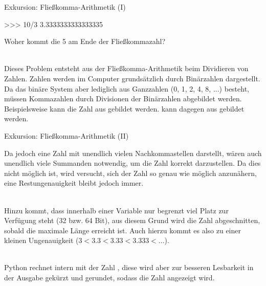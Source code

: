         \begin{frame}[fragile]{Exkursion: Fließkomma-Arithmetik (I)}
\begin{pyconcode}
>>> 10/3
3.3333333333333335
\end{pyconcode}     

        Woher kommt die 5 am Ende der Fließkommazahl? \\~\
        
        Dieses Problem entsteht aus der Fließkomma-Arithmetik beim Dividieren von Zahlen.
        Zahlen werden im Computer grundsätzlich durch Binärzahlen dargestellt. Da das binäre System aber lediglich aus Ganzzahlen (0, 1, 2, 4, 8, ...) besteht, müssen Kommazahlen durch Divisionen der Binärzahlen abgebildet werden. Beispielsweise kann die Zahl  aus  gebildet werden.  kann dagegen aus  gebildet werden.
        
        
        
        \end{frame}
        
        \begin{frame}[fragile]{Exkursion: Fließkomma-Arithmetik (II)}
            
             Da  jedoch eine Zahl mit unendlich vielen Nachkommastellen darstellt, wären auch unendlich viele Summanden notwendig, um die Zahl korrekt darzustellen. Da dies nicht  möglich ist, wird versucht, sich der Zahl so genau wie möglich anzunähern, eine Restungenauigkeit bleibt jedoch immer. \\~\
             
             Hinzu kommt, dass innerhalb einer Variable nur begrenzt viel Platz zur Verfügung steht (32 bzw. 64 Bit), aus diesem Grund wird die Zahl abgeschnitten, sobald die maximale Länge erreicht ist. Auch hierzu kommt es also zu einer kleinen Ungenauigkeit ($ 3 < 3.3 < 3.33 < 3.333 < ...$).\\~\
             
             Python rechnet intern mit der Zahl , diese wird aber zur besseren Lesbarkeit in der Ausgabe gekürzt und gerundet, sodass die Zahl  angezeigt wird.
             
        \end{frame}
        
